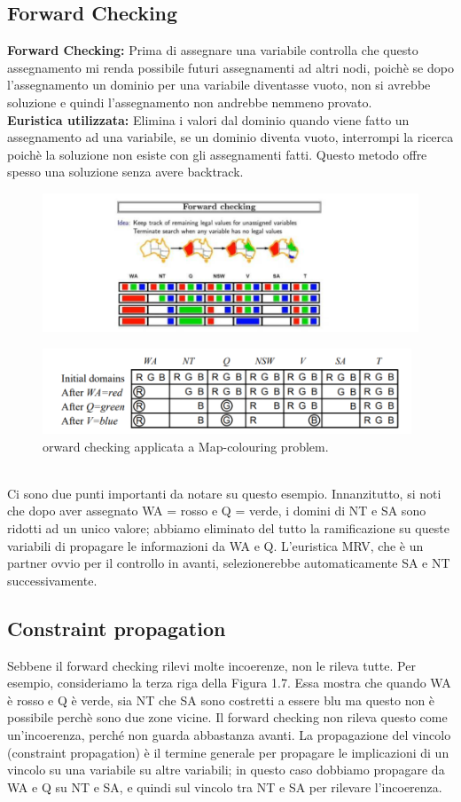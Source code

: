 \subsection{Forward Checking}
\textbf{Forward Checking: }  Prima di assegnare una variabile controlla che questo assegnamento mi renda possibile futuri assegnamenti ad altri nodi, poichè se dopo l’assegnamento un dominio per una variabile diventasse vuoto, non si avrebbe soluzione e quindi l’assegnamento non andrebbe nemmeno provato.
\\\textbf{Euristica utilizzata: }  Elimina i valori dal dominio quando viene fatto un
assegnamento ad una variabile, se un dominio diventa vuoto, interrompi la ricerca poichè la soluzione non esiste con gli assegnamenti fatti. Questo metodo offre spesso una soluzione senza avere backtrack.
\begin{figure}[htp]
    \centering
    \includegraphics[width=12cm, keepaspectratio]{img/Cap2/f1.png}
\end{figure}
\begin{figure}[htp]
    \centering
    \includegraphics[width=11cm, keepaspectratio]{img/Cap2/f2.png}
    \caption{orward checking applicata a Map-colouring problem.}
\end{figure}
\\Ci sono due punti importanti da notare su questo esempio. Innanzitutto, si noti che dopo aver assegnato WA = rosso e Q = verde, i domini di NT e SA sono ridotti ad un unico valore; abbiamo eliminato del tutto la ramificazione su queste variabili di propagare le informazioni da WA e Q. L’euristica MRV, che è un partner ovvio per il controllo in avanti, selezionerebbe automaticamente SA e NT successivamente.
\subsection{Constraint propagation}
Sebbene il forward checking rilevi molte incoerenze, non le rileva tutte. Per esempio, consideriamo la terza riga della Figura 1.7. Essa mostra che quando WA è rosso e Q è verde, sia NT che SA sono costretti a essere blu ma questo non è possibile perchè sono due zone vicine. Il forward checking non rileva questo come un’incoerenza, perché non guarda abbastanza avanti. La propagazione del vincolo (constraint propagation) è il termine generale per propagare le implicazioni di un vincolo su una variabile su altre variabili; in questo caso dobbiamo propagare da WA e Q su NT e SA, e quindi sul vincolo tra NT e SA per rilevare l’incoerenza.
